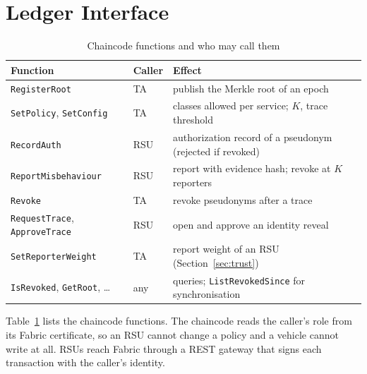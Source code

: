 \section{Ledger Interface}

\begin{table}[htbp]\centering\small
\caption{Chaincode functions and who may call them}\label{tab:chaincode}
\begin{tabular}{@{}llp{7.2cm}@{}}
\toprule
Function & Caller & Effect \\
\midrule
\texttt{RegisterRoot} & TA & publish the Merkle root of an epoch \\
\texttt{SetPolicy}, \texttt{SetConfig} & TA & classes allowed per service; $K$, trace threshold \\
\texttt{RecordAuth} & RSU & authorization record of a pseudonym (rejected if revoked) \\
\texttt{ReportMisbehaviour} & RSU & report with evidence hash; revoke at $K$ reporters \\
\texttt{Revoke} & TA & revoke pseudonyms after a trace \\
\texttt{RequestTrace}, \texttt{ApproveTrace} & RSU & open and approve an identity reveal \\
\texttt{SetReporterWeight} & TA & report weight of an RSU (Section~\ref{sec:trust}) \\
\texttt{IsRevoked}, \texttt{GetRoot}, \ldots & any & queries; \texttt{ListRevokedSince} for synchronisation \\
\bottomrule
\end{tabular}
\end{table}

Table~\ref{tab:chaincode} lists the chaincode functions. The chaincode reads the caller's role from
its Fabric certificate, so an RSU cannot change a policy and a vehicle cannot write at all. RSUs reach
Fabric through a REST gateway that signs each transaction with the caller's identity.

